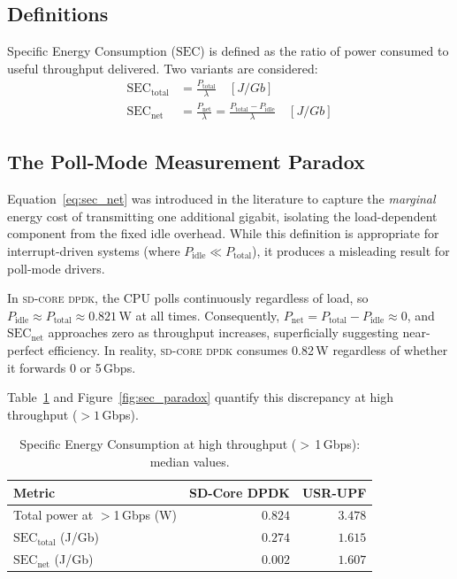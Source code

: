 \documentclass[12pt, a4paper]{report}
\newcommand{\dpdk}{\textsc{sd-core dpdk}}
\newcommand{\secm}{$\mathrm{SEC}$}
\newcommand{\sectable}{$\mathrm{SEC}_{\mathrm{total}}$}
\newcommand{\secnet}{$\mathrm{SEC}_{\mathrm{net}}$}
\begin{document}
\subsection{Definitions}

Specific Energy Consumption (\secm{}) is defined as the ratio of power
consumed to useful throughput delivered.
Two variants are considered:
\begin{align}
  \mathrm{SEC}_{\mathrm{total}} &= \frac{P_{\mathrm{total}}}{\lambda}
    \quad \left[J/Gb\right] \label{eq:sec_total} \\
  \mathrm{SEC}_{\mathrm{net}}   &= \frac{P_{\mathrm{net}}}{\lambda}
    = \frac{P_{\mathrm{total}} - P_{\mathrm{idle}}}{\lambda}
    \quad \left[J/Gb\right] \label{eq:sec_net}
\end{align}

\subsection{The Poll-Mode Measurement Paradox}

Equation~\eqref{eq:sec_net} was introduced in the literature to capture
the \emph{marginal} energy cost of transmitting one additional gigabit,
isolating the load-dependent component from the fixed idle overhead.
While this definition is appropriate for interrupt-driven systems (where
$P_{\mathrm{idle}} \ll P_{\mathrm{total}}$), it produces a misleading
result for poll-mode drivers.

In \dpdk{}, the CPU polls continuously regardless of load, so
$P_{\mathrm{idle}} \approx P_{\mathrm{total}} \approx 0.821$\,W at all
times.
Consequently, $P_{\mathrm{net}} = P_{\mathrm{total}} - P_{\mathrm{idle}}
\approx 0$, and \secnet{} approaches zero as throughput increases,
superficially suggesting near-perfect efficiency.
In reality, \dpdk{} consumes 0.82\,W regardless of whether it
forwards 0 or 5\,Gbps.

Table~\ref{tab:sec} and Figure~\ref{fig:sec_paradox} quantify this
discrepancy at high throughput ($>1$\,Gbps).

\begin{table}[htbp]
  \centering
  \caption{Specific Energy Consumption at high throughput ($>$\,1\,Gbps):
    median values.}
  \label{tab:sec}
  \begin{tabular}{lrr}
    \toprule
    \textbf{Metric} & \textbf{SD-Core DPDK} & \textbf{USR-UPF} \\
    \midrule
    Total power at $>$1\,Gbps (W)             & $0.824$ & $3.478$ \\
    \sectable{} (J/Gb) & $0.274$ & $1.615$ \\
    \secnet{} (J/Gb)   & $0.002$ & $1.607$ \\
    \bottomrule
  \end{tabular}
\end{table}
\end{document}
